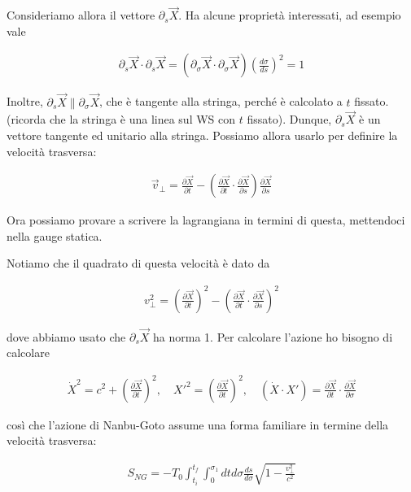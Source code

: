 \documentclass{report}
\begin{document}
Consideriamo allora il vettore \(\partial_s \vec{X}\). Ha alcune proprietà interessati, ad esempio vale 

\begin{align}
    \partial_s\vec{X}\cdot \partial_s\vec{X} = (\partial_\sigma\vec{X}\cdot \partial_\sigma\vec{X})\left(\frac{d\sigma}{ds} \right)^2  = 1 
\end{align}

Inoltre, \(\partial_s \vec{X} \parallel \partial_\sigma \vec{X}\), che è tangente alla stringa, perché è calcolato a \(t\) fissato. (ricorda che la stringa è una linea sul WS con \(t\) fissato). Dunque, \(\partial_s \vec{X}\) è un vettore tangente ed unitario alla stringa. Possiamo allora usarlo per definire la velocità trasversa: 

\begin{align}
    \vec{v}_{\perp} = \frac{\partial \vec{X}}{\partial t} - \left(\frac{\partial \vec{X}}{\partial t}\cdot \frac{\partial \vec{X}}{\partial s} \right)\frac{\partial \vec{X}}{\partial s}
\end{align}

Ora possiamo provare a scrivere la lagrangiana in termini di questa, mettendoci nella gauge statica. 

Notiamo che il quadrato di questa velocità è dato da 

\begin{align}
    v_\perp^2 = \left(\frac{\partial\vec{X}}{\partial t}\right)^2 - \left(\frac{\partial\vec{X}}{\partial t}\cdot\frac{\partial \vec{X}}{\partial s} \right)^2
\end{align}

dove abbiamo usato che \(\partial_s \vec{X}\) ha norma 1. Per calcolare l'azione ho bisogno di calcolare 

\begin{align}
    \dot{X}^2 = c^2 + \left(\frac{\partial \vec{X}}{\partial t} \right)^2, \quad X'^2 = \left(\frac{\partial \vec{X}}{\partial t} \right)^2, \quad (\dot{X}\cdot X') = \frac{\partial \vec{X}}{\partial t}\cdot \frac{\partial\vec{X}}{\partial \sigma}
\end{align}

così che l'azione di Nanbu-Goto assume una forma familiare in termine della velocità trasversa: 

\begin{align}
    S_{NG} = -T_0 \int_{t_i}^{t_f}\int_0^{\sigma_1}dt d\sigma \frac{ds}{d\sigma} \sqrt{1 - \frac{v_\perp^2}{c^2}}
\end{align}
\end{document}
